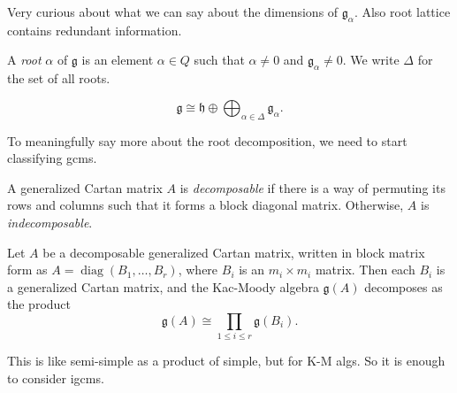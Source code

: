 \documentclass[11pt, letterpaper]{article}
\theoremstyle{plain}
\begin{document}
Very curious about what we can say about the dimensions of $\mathfrak{g} _\alpha $. Also root lattice contains redundant information.

\begin{definition}\label{dfn:6-5}
	A \emph{root} $\alpha $ of $\mathfrak{g} $ is an element $\alpha \in Q$ such that $\alpha \neq 0$ and $\mathfrak{g} _{\alpha } \neq 0$. We write $\Delta $ for the set of all roots.
\end{definition}

\begin{corollary}\label{cor:6-6}
	\[
		\mathfrak{g} \cong \mathfrak{h} \oplus \bigoplus_{\alpha \in \Delta } \mathfrak{g} _{\alpha } 
	.\]
\end{corollary}

To meaningfully say more about the root decomposition, we need to start classifying gcms.


\begin{definition}\label{dfn:6-7}
	A generalized Cartan matrix $A$ is \emph{decomposable} if there is a way of permuting its rows and columns such that it forms a block diagonal matrix. Otherwise, $A$ is \emph{indecomposable}.
\end{definition}
\begin{proposition}\label{prp:6-8}
	Let $A$ be a decomposable generalized Cartan matrix, written in block matrix form as $A = \operatorname{diag} (B_1, \ldots , B_r)$, where $B_i$ is an $m_i \times m_i$ matrix. Then each $B_i$ is a generalized Cartan matrix, and the Kac-Moody algebra $\mathfrak{g} (A)$ decomposes as the product
	\[
		\mathfrak{g}(A) \cong \prod_{1\leq i\leq r} \mathfrak{g} (B_i)
	.\]
\end{proposition}

This is like semi-simple as a product of simple, but for K-M algs. So it is enough to consider igcms.
\end{document}
